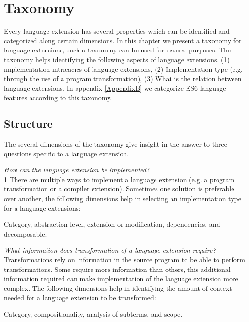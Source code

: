 
\chapter{Taxonomy} %

\label{Chapter4}

 \label{taxonomy}

Every language extension has several properties which can be identified and categorized along certain dimensions. In this chapter we present a taxonomy for language extensions, such a taxonomy can be used for several purposes. The taxonomy helps identifying the following aspects of language extensions, (1) implementation intricacies of language extensions, (2) Implementation type (e.g. through the use of a program transformation), (3) What is the relation between language extensions. In appendix \ref{AppendixB} we categorize ES6 language features according to this taxonomy.

\section{Structure}

The several dimensions of the taxonomy give insight in the answer to three questions specific to a language extension.

\textit{How can the language extension be implemented?}\\1
There are multiple ways to implement a language extension (e.g. a program transformation or a compiler extension). Sometimes one solution is preferable over another, the following dimensions help in selecting an implementation type for a language extensions:

Category, abstraction level, extension or modification, dependencies, and decomposable.

\textit{What information does transformation of a language extension require?}\\
Transformations rely on information in the source program to be able to perform transformations. Some require more information than others, this additional information required can make implementation of the language extension more complex. The following dimensions help in identifying the amount of context needed for a language extension to be transformed:

Category, compositionality, analysis of subterms, and scope.

